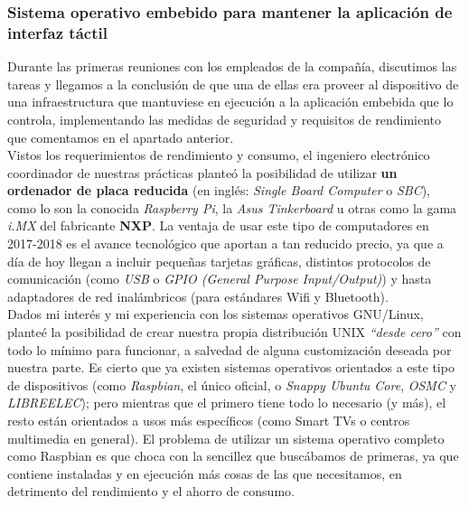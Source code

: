 \documentclass[13pt]{scrartcl}
\begin{document}
			\subsubsection{Sistema operativo embebido para mantener la aplicación de interfaz táctil}
				Durante las primeras reuniones con los empleados de la compañía, discutimos las tareas y llegamos a la conclusión de que una de ellas era proveer al dispositivo de una infraestructura que mantuviese en ejecución a la aplicación embebida que lo controla, implementando las medidas de seguridad y requisitos de rendimiento que comentamos en el apartado anterior.\\
				
				Vistos los requerimientos de rendimiento y consumo, el ingeniero electrónico coordinador de nuestras prácticas planteó la posibilidad de utilizar \textbf{un ordenador de placa reducida} (en inglés: \textit{Single Board Computer} o \textit{SBC}), como lo son la conocida \textit{Raspberry Pi}, la \textit{Asus Tinkerboard} u otras como la gama \textit{i.MX} del fabricante \textbf{NXP}. La ventaja de usar este tipo de computadores en 2017-2018 es el avance tecnológico que aportan a tan reducido precio, ya que a día de hoy llegan a incluir pequeñas tarjetas gráficas, distintos protocolos de comunicación (como \textit{USB} o \textit{GPIO (General Purpose Input/Output)}) y hasta adaptadores de red inalámbricos (para estándares Wifi y Bluetooth).\\
				
				Dados mi interés y mi experiencia con los sistemas operativos GNU/Linux, planteé la posibilidad de crear nuestra propia distribución UNIX \textit{``desde cero''} con todo lo mínimo para funcionar, a salvedad de alguna customización deseada por nuestra parte. Es cierto que ya existen sistemas operativos orientados a este tipo de dispositivos (como \textit{Raspbian}, el único oficial, o \textit{Snappy Ubuntu Core}, \textit{OSMC} y \textit{LIBREELEC}); pero mientras que el primero tiene todo lo necesario (y más), el resto están orientados a usos más específicos (como Smart TVs o centros multimedia en general). El problema de utilizar un sistema operativo completo como Raspbian es que choca con la sencillez que buscábamos de primeras, ya que contiene instaladas y en ejecución más cosas de las que necesitamos, en detrimento del rendimiento y el ahorro de consumo.\\
				
\end{document}
